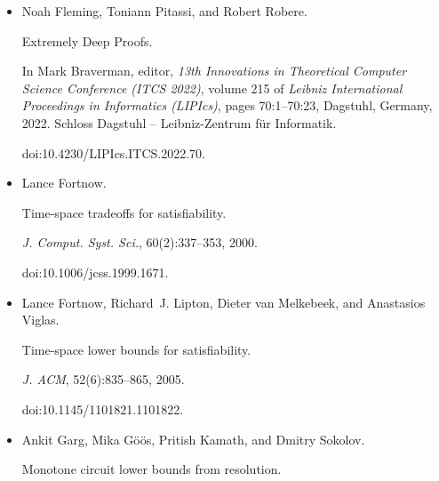 \documentclass[10pt,a4paper]{article}
\begin{document}
\begin{itemize}
Klim Efremenko, Michal Garlík, and Dmitry Itsykson.


Lower bounds for regular resolution over parities.


In Bojan Mohar, Igor Shinkar, and Ryan O’Donnell, editors, \emph{Proceedings of the 56th Annual ACM Symposium on Theory of Computing, STOC
2024, Vancouver, BC, Canada, June 24-28, 2024}, pages 640–651. ACM, 2024.


doi:10.1145/3618260.3649652.





\item[] 
[14]

Noah Fleming, Toniann Pitassi, and Robert Robere.


Extremely Deep Proofs.


In Mark Braverman, editor, \emph{13th Innovations in Theoretical
Computer Science Conference (ITCS 2022)}, volume 215 of \emph{Leibniz
International Proceedings in Informatics (LIPIcs)}, pages 70:1–70:23,
Dagstuhl, Germany, 2022. Schloss Dagstuhl – Leibniz-Zentrum für
Informatik.


doi:10.4230/LIPIcs.ITCS.2022.70.





\item[] 
[15]

Lance Fortnow.


Time-space tradeoffs for satisfiability.


\emph{J. Comput. Syst. Sci.}, 60(2):337–353, 2000.


doi:10.1006/jcss.1999.1671.





\item[] 
[16]

Lance Fortnow, Richard J. Lipton, Dieter van Melkebeek, and Anastasios Viglas.


Time-space lower bounds for satisfiability.


\emph{J. ACM}, 52(6):835–865, 2005.


doi:10.1145/1101821.1101822.





\item[] 
[17]

Ankit Garg, Mika Göös, Pritish Kamath, and Dmitry Sokolov.


Monotone circuit lower bounds from resolution.



\end{itemize}
\end{document}
